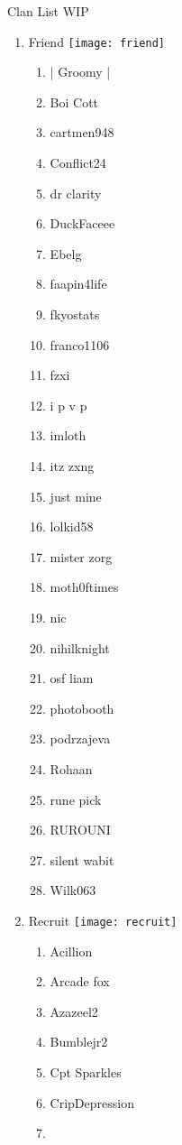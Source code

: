 \documentclass{article}
\begin{document}
Clan List WIP
\begin{enumerate}[I]
  \item 
    Friend \texttt{[image: friend]}
    \begin{enumerate}[I]
      \item
	| Groomy |
      \item
	Boi Cott
      \item
	cartmen948
      \item
	Conflict24
      \item
	dr clarity
      \item
	DuckFaceee
      \item
	Ebelg
      \item
	faapin4life
      \item
	fkyostats
      \item
	franco1106
      \item
	fzxi
      \item
	i p v p
      \item
	imloth
      \item
	itz zxng
      \item
	just mine
      \item
	lolkid58
      \item
	mister zorg
      \item
	moth0ftimes
      \item
	nic
      \item
	nihilknight
      \item
	osf liam
      \item
	photobooth
      \item
	podrzajeva
      \item
	Rohaan
      \item
	rune pick
      \item
	RUROUNI
      \item
	silent wabit
      \item
	Wilk063
    \end{enumerate}
  \item
    Recruit \texttt{[image: recruit]}
    \begin{enumerate}[I]
      \item 
	Acillion
      \item
	Arcade fox
      \item
	Azazeel2
      \item
	Bumblejr2
      \item
	Cpt Sparkles
      \item
	CripDepression
      \item

\end{enumerate}
\end{enumerate}
\end{document}
